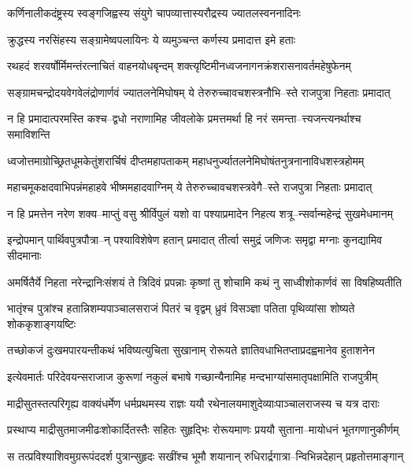 \twolineshloka
{कर्णिनालीकदंष्ट्रस्य स्वङ्गजिह्वस्य संयुगे}
{चापव्यात्तास्यरौद्रस्य ज्यातलस्वननादिनः}


\twolineshloka
{क्रुद्धस्य नरसिंहस्य सङ्ग्रामेष्वपलायिनः}
{ये व्यमुञ्चन्त कर्णस्य प्रमादात्त इमे हताः}


\twolineshloka
{रथहदं शरवर्षोर्मिमन्तंरत्नाचितं वाहनयोधबृन्दम्}
{शक्त्यृष्टिमीनध्वजनागनक्रंशरासनावर्तमहेषुफेनम्}


\twolineshloka
{सङ्ग्रामचन्द्रोदयवेगवेलंद्रोणार्णवं ज्यातलनेमिघोषम्}
{ये तेरुरुच्चावचशस्त्रनौभि--स्ते राजपुत्रा निहताः प्रमादात्}


\twolineshloka
{न हि प्रमादात्परमस्ति कश्च--द्वधो नराणामिह जीवलोके}
{प्रमत्तमर्था हि नरं समन्ता--त्त्यजन्त्यनर्थाश्च समाविशन्ति}


\twolineshloka
{ध्वजोत्तमाग्रोच्छ्रितधूमकेतुंशरार्चिषं दीप्तमहापताकम्}
{महाधनुर्ज्यातलनेमिघोषंतनुत्रनानाविधशस्त्रहोमम्}


\twolineshloka
{महाचमूकक्षदवाभिपन्नंमहाहवे भीष्ममहादवाग्निम्}
{ये तेरुरुच्चावचशस्त्रवेगै--स्ते राजपुत्रा निहताः प्रमादात्}


\twolineshloka
{न हि प्रमत्तेन नरेण शक्य--माप्तुं वसु श्रीर्विपुलं यशो वा}
{पश्याप्रमादेन निहत्य शत्रू--न्सर्वान्महेन्द्रं सुखमेधमानम्}


\threelineshloka
{इन्द्रोपमान् पार्थिवपुत्रपौत्रा--न् पश्याविशेषेण हतान् प्रमादात्}
{तीर्त्वा समुद्रं जणिजः समृद्वा}
{मग्नाः कुनद्यामिव सीदमानाः}


\twolineshloka
{अमर्षितैर्ये निहता नरेन्द्रानिःसंशयं ते त्रिदिवं प्रपन्नाः}
{कृष्णां तु शोचामि कथं नु साध्वीशोकार्णवं सा विषहिष्यतीति}


\twolineshloka
{भातृंश्च पुत्रांश्च हतान्निशम्यपाञ्चालसराजं पितरं च वृद्वम्}
{ध्रुवं विसञ्ज्ञा पतिता पृथिव्यांसा शोष्यते शोककृशाङ्गयष्टिः}


\twolineshloka
{तच्छोकजं दुःखमपारयन्तीकथं भविष्यत्युचिता सुखानाम्}
{रोरूयते ज्ञातिवधाभितप्ताप्रदह्वमानेव हुताशनेन}


\twolineshloka
{इत्येवमार्तः परिदेवयन्सराजाज कुरूणां नकुलं बभाषे}
{गच्छान्यैनामिह मन्दभाग्यांसमातृपक्षामिति राजपुत्रीम्}


\twolineshloka
{माद्रीसुतस्तत्परिगृह्य वाक्यंधर्मेण धर्मप्रथमस्य राज्ञः}
{ययौ रथेनालयमाशुदेव्याःपाञ्चालराजस्य च यत्र दाराः}


\twolineshloka
{प्रस्थाप्य माद्रीसुतमाजमीढःशोकार्दितस्तैः सहितः सुहृद्भिः}
{रोरूयमाणः प्रययौ सुताना--मायोधनं भूतगणानुकीर्णम्}


\twolineshloka
{स तत्प्रविश्याशिवमुग्ररूपंददर्श पुत्रान्सुहृदः सखींश्च}
{भूमौ शयानान् रुधिरार्द्रगात्रा--न्विभिन्नदेहान् प्रहृतोत्तमाङ्गान्}


